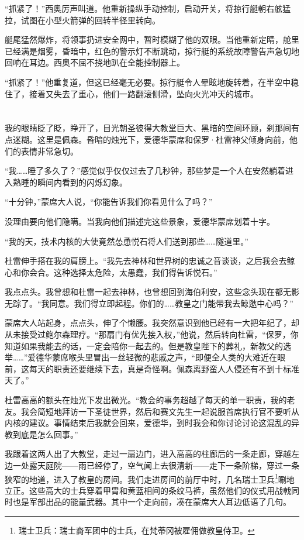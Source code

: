 \documentclass[AutoFakeBold=true]{book}
\begin{document}
``抓紧了！''西奥厉声叫道。他重新操纵手动控制，启动开关，将掠行艇朝右舷猛拉，试图在小型火箭弹的回转半径里转向。

艇尾猛然爆炸，将领事扔进安全网中，暂时模糊了他的双眼。当他重新定睛，舱里已经满是烟雾，昏暗中，红色的警示灯不断跳动，掠行艇的系统故障警告声急切地回响在耳边。西奥不屈不挠地趴在全能控制器上。

``抓紧了！''他重复道，但这已经毫无必要。掠行艇令人晕眩地旋转着，在半空中稳住了，接着又失去了重心，他们一路翻滚侧滑，坠向火光冲天的城市。

\chapter{}

我的眼睛眨了眨，睁开了，目光朝圣彼得大教堂巨大、黑暗的空间环顾，刹那间有点迷糊。这里是佩森。昏暗的烛光下，爱德华蒙席和保罗·杜雷神父倾身向前，他们的表情非常急切。

``我……睡了多久了？''感觉似乎仅仅过去了几秒钟，那些梦是一个人在安然躺着进入熟睡的瞬间内看到的闪烁幻象。

``十分钟，''蒙席大人说，``你能告诉我们你看见什么了吗？''

没理由要向他们隐瞒。当我向他们描述完这些景象，爱德华蒙席划着十字。

``我的天，技术内核的大使竟然怂恿悦石将人们送到那些……隧道里。''

杜雷伸手搭在我的肩膀上。``我先去神林和世界树的忠诚之音谈谈，之后我会去鲸心和你会合。这种选择太危险，太愚蠢，我们得告诉悦石。''

我点点头。我曾想和杜雷一起去神林，也曾想回到海伯利安，这些念头现在都无影无踪了。``我同意。我们得立即起程。你们的……教皇之门能带我去鲸逖中心吗？''

蒙席大人站起身，点点头，伸了个懒腰。我突然意识到他已经有一大把年纪了，却从未接受过鲍尔森理疗。``那扇门有优先接入权，''他说，然后转向杜雷，``保罗，你知道如果我能去的话，一定会陪你一起去的。但是教皇陛下的葬礼，新教父的选举……''爱德华蒙席喉头里冒出一丝轻微的悲戚之声，``即便全人类的大难近在眼前，这每天的职责还要继续下去，真是奇怪啊。佩森离野蛮人人侵还有不到十标准天了。''

杜雷高高的额头在烛光下发出微光。``教会的事务超越了每天的单一职责，我的老友。我会简短地拜访一下圣徒世界，然后和赛文先生一起说服首席执行官不要听从内核的建议。事情结束后我就会回来，爱德华，到时我会和你讨论讨论这混乱的异教到底是怎么回事。''

我跟着这两人出了大教堂，走过一扇边门，进入高高的柱廊后的一条走廊，穿越左边一处露天庭院——雨已经停了，空气闻上去很清新——走下一条阶梯，穿过一条狭窄的地道，进入了教皇的房间。我们走进房间的前厅中时，几名瑞士卫兵\footnote{瑞士卫兵：瑞士裔军团中的士兵，在梵蒂冈被雇佣做教皇侍卫。}唰地立正。这些高大的士兵穿着甲胄和黄蓝相间的条纹马裤，虽然他们的仪式用战戟同时也是军部出品的能量武器。其中一个走向前，凑在蒙席大人耳边低语了几句。
\end{document}
